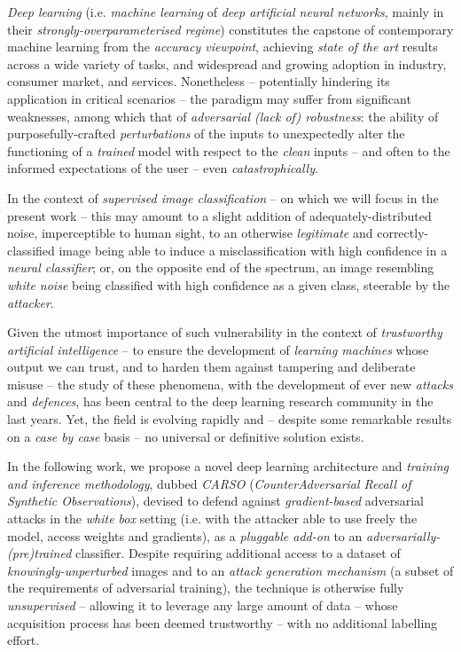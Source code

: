 

\textit{Deep learning} (i.e. \textit{machine learning} of \textit{deep artificial neural networks}, mainly in their \textit{strongly-overparameterised regime}) constitutes the capstone of contemporary machine learning from the \textit{accuracy viewpoint}, achieving \textit{state of the art}  results across a wide variety of tasks, and widespread and growing adoption in industry, consumer market, and services. Nonetheless – potentially hindering its application in critical scenarios – the paradigm may suffer from significant weaknesses, among which that of \textit{adversarial (lack of) robustness}: the ability of purposefully-crafted \textit{perturbations} of the inputs to unexpectedly alter the functioning of a \textit{trained} model with respect to the \textit{clean} inputs – and often to the informed expectations of the user – even \textit{catastrophically}.

In the context of \textit{supervised image classification} – on which we will focus in the present work – this may amount to a slight addition of adequately-distributed noise, imperceptible to human sight, to an otherwise \textit{legitimate} and correctly-classified image being able to induce a misclassification with high confidence in a \textit{neural classifier}; or, on the opposite end of the spectrum, an image resembling \textit{white noise} being classified with high confidence as a given class, steerable by the \textit{attacker}.

Given the utmost importance of such vulnerability in the context of \textit{trustworthy artificial intelligence} – to ensure the development of \textit{learning machines} whose output we can trust, and to harden them against tampering and deliberate misuse – the study of these phenomena, with the development of ever new \textit{attacks} and \textit{defences}, has been central to the deep learning research community in the last years. Yet, the field is evolving rapidly and – despite some remarkable results on a \textit{case by case} basis – no universal or definitive solution exists.

In the following work, we propose a novel deep learning architecture and \textit{training and inference methodology}, dubbed \textit{CARSO} (\textit{CounterAdversarial Recall of Synthetic Observations}), devised to defend against \textit{gradient-based} adversarial attacks in the \textit{white box} setting (i.e. with the attacker able to use freely the model, access weights and gradients), as a \textit{pluggable add-on} to an \textit{adversarially-(pre)trained} classifier. Despite requiring additional access to a dataset of \textit{knowingly-unperturbed} images and to an \textit{attack generation mechanism} (a subset of the requirements of adversarial training), the technique is otherwise fully \textit{unsupervised} – allowing it to leverage any large amount of data – whose acquisition process has been deemed trustworthy – with no additional labelling effort.

